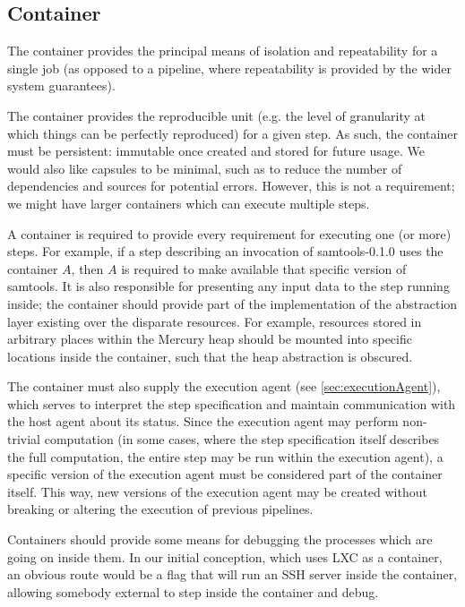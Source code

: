 \documentclass[10pt,a4paper]{article}
\newcommand{\npar}{\par\noindent\space}
\begin{document}
\subsection{Container}
\npar The container provides the principal means of isolation and repeatability for a single job (as opposed to a pipeline, where repeatability is provided by the wider system guarantees).
\npar The container provides the reproducible unit (e.g. the level of granularity at which things can be perfectly reproduced) for a given step. As such, the container must be persistent: immutable once created and stored for future usage. We would also like capsules to be minimal, such as to reduce the number of dependencies and sources for potential errors. However, this is not a requirement; we might have larger containers which can execute multiple steps.
\npar A container is required to provide every requirement for executing one (or more) steps. For example, if a step describing an invocation of samtools-0.1.0 uses the container $ A $, then $ A $ is required to make available that specific version of samtools. It is also responsible for presenting any input data to the step running inside; the container should provide part of the implementation of the abstraction layer existing over the disparate resources. For example, resources stored in arbitrary places within the Mercury heap should be mounted into specific locations inside the container, such that the heap abstraction is obscured.
\npar The container must also supply the execution agent (see \ref{sec:executionAgent}), which serves to interpret the step specification and maintain communication with the host agent about its status. Since the execution agent may perform non-trivial computation (in some cases, where the step specification itself describes the full computation, the entire step may be run within the execution agent), a specific version of the execution agent must be considered part of the container itself. This way, new versions of the execution agent may be created without breaking or altering the execution of previous pipelines.
\npar Containers should provide some means for debugging the processes which are going on inside them. In our initial conception, which uses LXC as a container, an obvious route would be a flag that will run an SSH server inside the container, allowing somebody external to step inside the container and debug.
\end{document}
